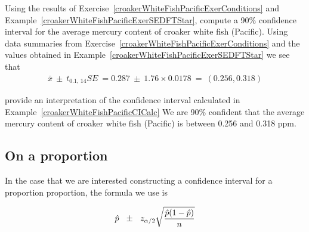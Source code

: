 \begin{example}{Using the results of Exercise~\ref{croakerWhiteFishPacificExerConditions} and Example~\ref{croakerWhiteFishPacificExerSEDFTStar}, compute a 90\% confidence interval for the average mercury content of croaker white fish (Pacific).}\label{croakerWhiteFishPacificCICalc}
Using data summaries from Exercise~\ref{croakerWhiteFishPacificExerConditions}
and the values obtained in Example~\ref{croakerWhiteFishPacificExerSEDFTStar} we see that
\begin{align}
\bar{x} \ \pm\ t_{0.1, \,14} SE \ =  0.287 \ \pm\  1.76 \times 0.0178\ = \ (0.256, 0.318) 
\end{align}

\end{example}



\begin{example}{provide an interpretation of the confidence interval calculated in Example~\ref{croakerWhiteFishPacificCICalc} }
We are 90\% confident that the average mercury content of croaker white fish (Pacific) is between 0.256 and 0.318 ppm.
\end{example}


{\color{red}{FILL UP WITH SOMETHING}}

\vfill

\pagebreak

\subsection{On a proportion}

In the case that we are interested constructing a confidence interval for a proportion proportion, 
the formula we use is


\begin{termBox}{
\begin{equation}
\hat{p}	~~ \pm ~~		z_{\alpha / 2} 	\sqrt{ \frac{\hat{p}(1 - \hat{p})}{n} }	\label{eqnCIOnP}\\
\end{equation}
}
\end{termBox}
\vspace{0.25cm}

